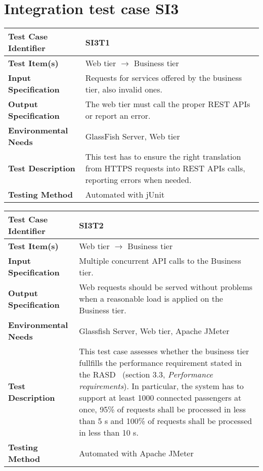 \vspace{2em}

\section{Integration test case SI3}

\begin{tabular}{l p{}}
    \hline
    \textbf{Test Case Identifier} & SI3T1\\
    \hline
    \textbf{Test Item(s)} & Web tier $\rightarrow$ Business tier\\
    \hline
    \textbf{Input Specification} & Requests for services offered by the business tier, also invalid ones.\\
    \hline
    \textbf{Output Specification} & The web tier must call the proper REST APIs or report an error. \\
    \hline
    \textbf{Environmental Needs} & GlassFish Server, Web tier\\
    \hline
    \textbf{Test Description} & This test has to ensure the right translation from HTTPS requests into REST APIs calls, reporting errors when needed.\\
    \hline
    \textbf{Testing Method} & Automated with jUnit \\
    \hline
\end{tabular}

\vspace{2em}

\noindent\begin{tabular}{l p{}}
    \hline
    \textbf{Test Case Identifier} & SI3T2\\
    \hline
    \textbf{Test Item(s)} & Web tier $\rightarrow$ Business tier\\
    \hline
    \textbf{Input Specification} & Multiple concurrent API calls to the Business tier.\\
    \hline
    \textbf{Output Specification} & Web requests should be served without problems when a reasonable load is applied on the Business tier. \\
    \hline
    \textbf{Environmental Needs} & Glassfish Server, Web tier, Apache JMeter\\
    \hline
    \textbf{Test Description} & This test case assesses whether the business tier fullfills the performance requirement stated in the RASD~\cite{mytaxi-rasd} (section 3.3, \emph{Performance requirements}). In particular, the system has to support at least 1000 connected passengers at once, 95\% of requests shall be processed in less than 5 s and 100\% of requests shall be processed in less than 10 s.\\
    \hline
    \textbf{Testing Method} & Automated with Apache JMeter \\
    \hline
\end{tabular}

